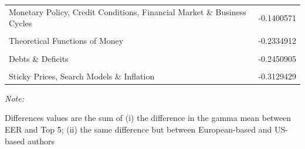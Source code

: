 \documentclass[]{elsarticle} %
\begin{document}
\begin{table}[!h]
\begin{threeparttable}
\begin{tabular}[t]{lr}
Monetary Policy, Credit Conditions, Financial Market \& Business Cycles & -0.1400571\\
\cellcolor{gray!6}{Demand for Money} & \cellcolor{gray!6}{-0.1564841}\\
Theoretical Functions of Money & -0.2334912\\
\cellcolor{gray!6}{New theoretical approaches of Money: search, random-matching} & \cellcolor{gray!6}{-0.2425576}\\
\addlinespace
Debts \& Deficits & -0.2450905\\
\cellcolor{gray!6}{Consumption: intertemporal substitution \& permanent income} & \cellcolor{gray!6}{-0.2639163}\\
Sticky Prices, Search Models \& Inflation & -0.3129429\\
\bottomrule
\end{tabular}
\begin{tablenotes}
\item \textit{Note: } 
\item Differences values are the sum of (i) the difference in the gamma mean between EER and Top 5; (ii) the same difference but between European-based and US-based authors
\end{tablenotes}
\end{threeparttable}
\end{table}
\end{document}
